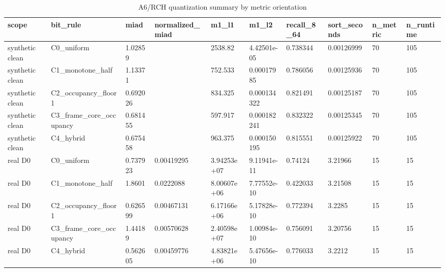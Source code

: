 \begin{table}
\caption{A6/RCH quantization summary by metric orientation}
\label{tab:rch_quantization_summary}
\begin{tabular}{llllllllll}
\toprule
scope & bit\_rule & miad & normalized\_miad & m1\_l1 & m1\_l2 & recall\_8\_64 & sort\_seconds & n\_metric & n\_runtime \\
\midrule
synthetic clean & C0\_uniform & 1.02859 &  & 2538.82 & 4.42501e-05 & 0.738344 & 0.00126999 & 70 & 105 \\
synthetic clean & C1\_monotone\_half & 1.13371 &  & 752.533 & 0.00017985 & 0.786056 & 0.00125936 & 70 & 105 \\
synthetic clean & C2\_occupancy\_floor1 & 0.692026 &  & 834.325 & 0.000134322 & 0.821491 & 0.00125187 & 70 & 105 \\
synthetic clean & C3\_frame\_core\_occupancy & 0.681455 &  & 597.917 & 0.000182241 & 0.832322 & 0.00125345 & 70 & 105 \\
synthetic clean & C4\_hybrid & 0.675458 &  & 963.375 & 0.000150195 & 0.815551 & 0.00125922 & 70 & 105 \\
real D0 & C0\_uniform & 0.737923 & 0.00419295 & 3.94253e+07 & 9.11941e-11 & 0.74124 & 3.21966 & 15 & 15 \\
real D0 & C1\_monotone\_half & 1.8601 & 0.0222088 & 8.00607e+06 & 7.77552e-10 & 0.422033 & 3.21508 & 15 & 15 \\
real D0 & C2\_occupancy\_floor1 & 0.626599 & 0.00467131 & 6.17166e+06 & 5.17828e-10 & 0.772394 & 3.2285 & 15 & 15 \\
real D0 & C3\_frame\_core\_occupancy & 1.44189 & 0.00570628 & 2.40598e+07 & 1.00984e-10 & 0.756091 & 3.20756 & 15 & 15 \\
real D0 & C4\_hybrid & 0.562605 & 0.00459776 & 4.83821e+06 & 5.47656e-10 & 0.776033 & 3.2212 & 15 & 15 \\
\bottomrule
\end{tabular}
\end{table}

